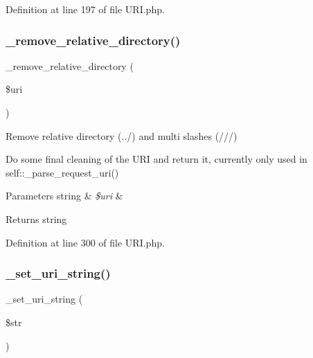 Definition at line 197 of file U\+R\+I.\+php.

\mbox{\label{class_c_i___u_r_i_a01fdc82a66a1611d3e5d42461c1ad59c}} 
\subsubsection{\texorpdfstring{\_remove\_relative\_directory()}{\_remove\_relative\_directory()}}
{\footnotesize\ttfamily \+\_\+remove\+\_\+relative\+\_\+directory (\begin{DoxyParamCaption}\item[{}]{\$uri }\end{DoxyParamCaption})\hspace{0.3cm}{\ttfamily [protected]}}

Remove relative directory (../) and multi slashes (///)

Do some final cleaning of the U\+RI and return it, currently only used in self\+::\+\_\+parse\+\_\+request\+\_\+uri()


\begin{DoxyParams}[1]{Parameters}
string & {\em \$uri} & \\
\hline
\end{DoxyParams}
\begin{DoxyReturn}{Returns}
string 
\end{DoxyReturn}


Definition at line 300 of file U\+R\+I.\+php.

\mbox{\label{class_c_i___u_r_i_a81a4c4d50fbac24b9ae091f9cfcaade3}} 
\subsubsection{\texorpdfstring{\_set\_uri\_string()}{\_set\_uri\_string()}}
{\footnotesize\ttfamily \+\_\+set\+\_\+uri\+\_\+string (\begin{DoxyParamCaption}\item[{}]{\$str }\end{DoxyParamCaption})\hspace{0.3cm}{\ttfamily [protected]}}

